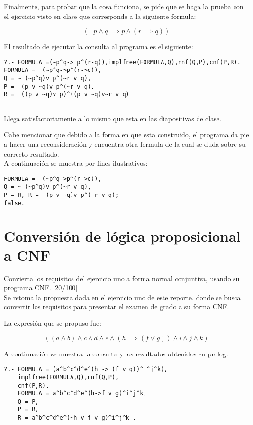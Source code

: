 \documentclass[11pt, letterpaper]{article}
\begin{document}
Finalmente, para probar que la cosa funciona, se pide que se haga la prueba con el ejercicio visto en clase que corresponde a la siguiente formula:

$$(\neg p \wedge q \implies p \wedge (r \implies q))$$

El resultado de ejecutar la consulta al programa es el siguiente:

\begin{verbatim}
?.- FORMULA =(~p^q-> p^(r-q)),implfree(FORMULA,Q),nnf(Q,P),cnf(P,R).
FORMULA =  (~p^q->p^(r->q)),
Q = ~ (~p^q)v p^(~r v q),
P =  (p v ~q)v p^(~r v q),
R =  ((p v ~q)v p)^((p v ~q)v~r v q) 
	
\end{verbatim}

Llega satisfactoriamente a lo mismo que esta en las diapositivas de clase.

Cabe mencionar que debido a la forma en que esta construido, el programa da pie a hacer una reconsideración y encuentra otra formula de la cual se duda sobre su correcto resultado. \\

A continuación se muestra por fines ilustrativos:

\begin{verbatim}
FORMULA =  (~p^q->p^(r->q)),
Q = ~ (~p^q)v p^(~r v q),
P = R, R =  (p v ~q)v p^(~r v q);
false.
\end{verbatim}



			
	\newpage
	
	\section{Conversión de lógica proposicional a CNF}
	
	Convierta los requisitos del ejercicio uno a forma normal conjuntiva, usando
	su programa CNF. [20/100] \\
	
	Se retoma la propuesta dada en el ejercicio uno de este reporte, donde se busca convertir los requisitos para presentar el examen de grado a su forma CNF.
	
	La expresión que se propuso fue:
	
	$$((a \wedge b) \wedge c \wedge d \wedge e \wedge (h \implies (f \vee g)) \wedge i \wedge j \wedge k)$$
	
	A continuación se muestra la consulta y los resultados obtenidos en prolog:
	
\begin{verbatim}
?.- FORMULA = (a^b^c^d^e^(h -> (f v g))^i^j^k),
	implfree(FORMULA,Q),nnf(Q,P),
	cnf(P,R).
	FORMULA = a^b^c^d^e^(h->f v g)^i^j^k,
	Q = P,
	P = R, 
	R = a^b^c^d^e^(~h v f v g)^i^j^k .
	
\end{verbatim}
	
\end{document}
